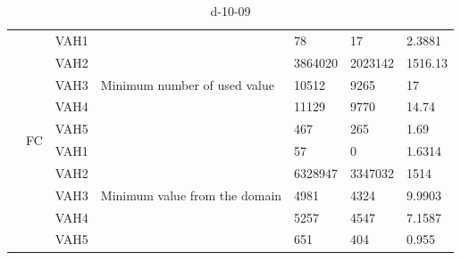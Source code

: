 \documentclass[14pt]{scrartcl} %
\begin{document}
\begin{table}[ht]
{\begin{tabular}{|l|l|l|l|l|l|l|}
                          & \multirow{10}{*}{FC} & VAH1 & \multirow{5}{*}{Minimum number of used value}  &  78      &  17           &   2.3881          \\ \cline{3-3} \cline{5-7} 
                          &                      & VAH2 &                                                & 3864020       &   2023142          &         1516.13    \\ \cline{3-3} \cline{5-7} 
                          &                      & VAH3 &                                                &10512       &        9265   &          17   \\ \cline{3-3} \cline{5-7} 
                          &                      & VAH4 &                                                &   11129     &       9770      &           14.74  \\ \cline{3-3} \cline{5-7} 
  \rowcolor{yellow}                          &                      & VAH5 &                                                &  467      &   265          &  1.69           \\ \cline{3-7} 
                          &                      & VAH1 & \multirow{5}{*}{Minimum value from the domain} &   57     & 0            &    1.6314       \\ \cline{3-3} \cline{5-7} 
                          &                      & VAH2 &                                                &  6328947      &        3347032     &  1514           \\ \cline{3-3} \cline{5-7} 
                          &                      & VAH3 &                                                &    4981    &      4324    &   9.9903          \\ \cline{3-3} \cline{5-7} 
                          &                      & VAH4 &                                                &   5257     &         4547    &     7.1587        \\ \cline{3-3} \cline{5-7} 
 \rowcolor{green}                         &                      & VAH5 &                                                &   651     & 404            &     0.955        \\ \hline
\end{tabular}
}
\caption{d-10-09}
\end{table}
\end{document}
